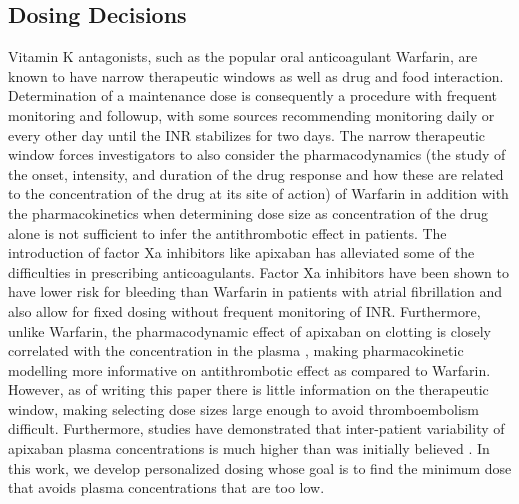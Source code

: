 \subsection*{Dosing Decisions}

Vitamin K antagonists, such as the popular oral anticoagulant Warfarin, are known to have narrow therapeutic windows as well as drug and food interaction. Determination of a maintenance dose is consequently a procedure with frequent monitoring and followup, with some sources recommending monitoring daily or every other day until the INR stabilizes for two days.  The narrow therapeutic window forces investigators to also consider the pharmacodynamics (the study of the onset, intensity, and duration of the drug response and how these are related to the concentration of the drug at its site of action) of Warfarin in addition with the pharmacokinetics when determining dose size as concentration of the drug alone is not sufficient to infer the antithrombotic effect in patients. The introduction of factor Xa inhibitors like apixaban has alleviated some of the difficulties in prescribing anticoagulants.  Factor Xa inhibitors have been shown to have lower risk for bleeding than Warfarin in patients with atrial fibrillation \citep{vinogradova2018risks} and also allow for fixed dosing without frequent monitoring of INR. Furthermore, unlike Warfarin, the pharmacodynamic effect of apixaban on clotting is closely correlated with the concentration in the plasma \citep{Byon2019-gf}, making pharmacokinetic modelling more informative on antithrombotic effect as compared to Warfarin.  However, as of writing this paper there is little information on the therapeutic window, making selecting dose sizes large enough to avoid thromboembolism difficult. Furthermore, studies have demonstrated that inter-patient variability of apixaban plasma concentrations is much higher than was initially believed \citep{gulilat2020drug}. In this work, we develop personalized dosing whose goal is to find the minimum dose that avoids plasma concentrations that are too low. 

